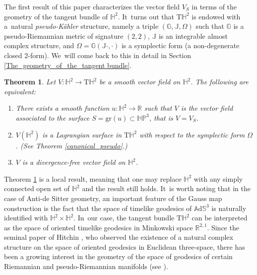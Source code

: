 \documentclass[10pt]{amsart}
\theoremstyle{plain}
\newtheorem{theorem}[cor]{Theorem}
\theoremstyle{definition}
\newcommand{\ads}{\mathbb{A}\mathrm{d}\mathbb{S}^3}
\newcommand{\HP}{\mathbb{HP}^3}
\begin{document}
The first result of this paper characterizes the vector field \(V_S\) in terms of the geometry of the tangent bundle of \(\mathbb{H}^2\). It~turns out that \(\mathrm{T}\mathbb{H}^2\) is endowed with a~natural \emph{pseudo-Kähler} structure, namely a triple \((\mathbb{G}, \mathbb{J}, \Omega)\) such that \(\mathbb{G}\) is a pseudo-Riemannian metric of signature \((2,2)\), \(\mathbb{J}\) is an integrable almost complex structure, and \(\Omega = \mathbb{G}(\mathbb{J} \cdot, \cdot)\) is a symplectic form (a non-degenerate closed $2$-form). We~will come back to this in detail in Section \ref{The_geometry_of_the_tangent bundle}.
\begin{theorem}\label{intro_divergence}
Let \(V: \mathbb{H}^2 \to \mathrm{T}\mathbb{H}^2\) be a smooth vector field on \(\mathbb{H}^2\). The following are equivalent:
\begin{enumerate}
\item There exists a smooth function \(u: \mathbb{H}^2 \to \mathbb{R}\) such that \(V\) is the vector field associated to the surface \(S = \mathrm{gr}(u) \subset \HP\), that is \(V = V_S\).
\item \(V(\mathbb{H}^2)\) is a \emph{Lagrangian} surface in \(\mathrm{T}\mathbb{H}^2\) with respect to the symplectic form \(\Omega\). (See Theorem \ref{canonical_pseudo}.)
\item \(V\) is a divergence-free vector field on \(\mathbb{H}^2\).
\end{enumerate}
\end{theorem}

Theorem \ref{intro_divergence} is a local result, meaning that one may replace $\mathbb{H}^2$ with any simply connected open set of $\mathbb{H}^2$ and the result still holds. It~is worth noting that in the case of Anti-de Sitter geometry, an important feature of the Gauss map construction is the fact that the space of timelike geodesics of \(\ads\) is naturally identified with \(\mathbb{H}^2 \times \mathbb{H}^2\). In~our case, the tangent bundle \(\mathrm{T}\mathbb{H}^2\) can be interpreted as the space of oriented timelike geodesics in Minkowski space \(\mathbb{R}^{2,1}\). Since the seminal paper of Hitchin \cite{Monopole_Hitchin}, who observed the existence of a natural complex structure on the space of oriented geodesics in Euclidean three-space, there has been a growing interest in the geometry of the space of geodesics of certain Riemannian and pseudo-Riemannian manifolds (see \cite{An_indi_Kaehler,Anciaux_space_of_geodesic,Salvai_Godoy_smooth_foliation,ML_in_tangent_bundle,Bon_Emam,Emam_Seppi1}).
\end{document}
